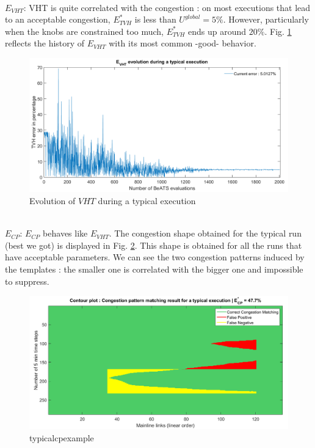 \\
\emph{$E_{VHT}$}: VHT is quite correlated with the congestion : on most executions that lead to an acceptable congestion, $E_{TVH}^{*}$ is less than $U^{global}=5\%$. However, particularly when the knobs are constrained too much,  $E_{TVH}^{*}$ ends up around $20\%$.
Fig. \ref{fig:vhtexample} reflects the history of $E_{VHT}$ with its most common -good- behavior.\\
\begin{figure}[h]
	\label{fig:vhtexample}
	\caption{Evolution of $VHT$ during a typical execution}
	\includegraphics[width=7in]{figures/results_figures/VHTexample.png}
\end{figure}
\\
\emph{$E_{CP}$}: $E_{CP}$ behaves like $E_{VHT}$. The congestion shape obtained for the typical run (best we got) is displayed in Fig. \ref{fig:typicalcpexample}. This shape is obtained for all the runs that have acceptable parameters. We can see the two congestion patterns induced by the templates : the smaller one is correlated with the bigger one and impossible to suppress.\\
\begin{figure}[h]
	\label{fig:typicalcpexample}
	\caption{typicalcpexample}
	\includegraphics[width=7in]{figures/results_figures/typicalcpexample.png}
\end{figure}	
